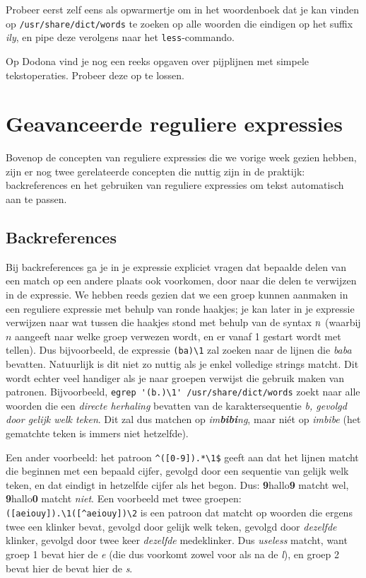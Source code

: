 \documentclass[a4paper,twoside,openany]{memoir}
\begin{document}
Probeer eerst zelf eens als opwarmertje om in het woordenboek dat je kan vinden
op \verb!/usr/share/dict/words! te zoeken op alle woorden die eindigen op het
suffix \emph{ily}, en pipe deze verolgens naar het \verb!less!-commando.

Op Dodona vind je nog een reeks opgaven over pijplijnen met simpele
tekstoperaties. Probeer deze op te lossen.

\chapter{Geavanceerde reguliere expressies}

Bovenop de concepten van reguliere expressies die we vorige week gezien hebben,
zijn er nog twee gerelateerde concepten die nuttig zijn in de praktijk:
backreferences en het gebruiken van reguliere expressies om tekst automatisch
aan te passen.

\section{Backreferences}

Bij backreferences ga je in je expressie expliciet vragen dat bepaalde delen van
een match op een andere plaats ook voorkomen, door naar die delen te verwijzen
in de expressie. We hebben reeds gezien dat we een groep kunnen aanmaken in een
reguliere expressie met behulp van ronde haakjes; je kan later in je expressie
verwijzen naar wat tussen die haakjes stond met behulp van de syntax  $\\n$
(waarbij $n$ aangeeft naar welke groep verwezen wordt, en er vanaf 1 gestart
wordt met tellen). Dus bijvoorbeeld, de expressie \verb!(ba)\1! zal zoeken naar
de lijnen die \emph{baba} bevatten. Natuurlijk is dit niet zo nuttig als je
enkel volledige strings matcht. Dit wordt echter veel handiger als je naar
groepen verwijst die gebruik maken van patronen. Bijvoorbeeld, \verb!egrep '(b.)\1' /usr/share/dict/words! zoekt naar alle woorden die een \emph{directe
herhaling} bevatten van de karaktersequentie \emph{b, gevolgd door gelijk welk
teken}. Dit zal dus matchen op \emph{im\textbf{bibi}ng}, maar niét op
\emph{imbibe} (het gematchte teken is immers niet hetzelfde).

Een ander voorbeeld: het patroon \verb!^([0-9]).*\1$! geeft aan dat het lijnen matcht die beginnen
met een bepaald cijfer, gevolgd door een sequentie van gelijk welk teken, en dat eindigt in hetzelfde cijfer
als het begon. Dus: \textbf{9}hallo\textbf{9} matcht wel, \textbf{9}hallo\textbf{0} matcht \emph{niet}.
Een voorbeeld met twee groepen: \verb!([aeiouy]).\1([^aeiouy])\2! is een patroon dat matcht op woorden
die ergens twee een klinker bevat, gevolgd door gelijk welk teken, gevolgd door \emph{dezelfde} klinker, gevolgd
door twee keer \emph{dezelfde} medeklinker. Dus \emph{useless} matcht, want groep 1 bevat hier de \emph{e} (die dus voorkomt zowel voor als na de \emph{l}), en groep
2 bevat hier de bevat hier de \emph{s}.
\end{document}
